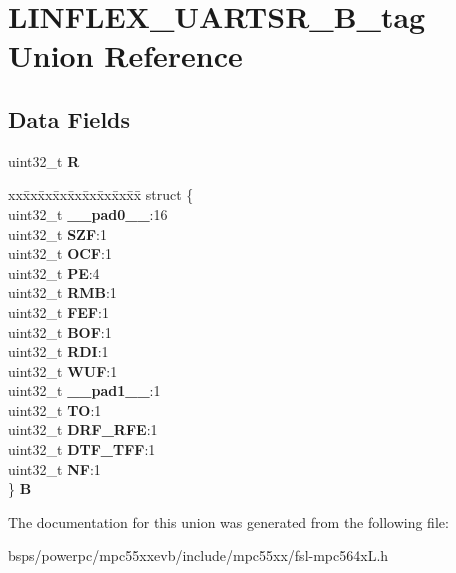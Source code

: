 \hypertarget{unionLINFLEX__UARTSR__32B__tag}{}\section{L\+I\+N\+F\+L\+E\+X\+\_\+\+U\+A\+R\+T\+S\+R\+\_\+B\+\_\+tag Union Reference}
\label{unionLINFLEX__UARTSR__32B__tag}
\subsection*{Data Fields}
\begin{DoxyCompactItemize}
\item 
\mbox{\label{unionLINFLEX__UARTSR__32B__tag_add5396fa221609f1218bc36d07edf76e}} 
uint32\+\_\+t {\bfseries R}
\item 
\mbox{\label{unionLINFLEX__UARTSR__32B__tag_a8f66f92f8185b42ebfa4aa36dd5bd1dd}} 
\begin{tabbing}
xx\=xx\=xx\=xx\=xx\=xx\=xx\=xx\=xx\=\kill
struct \{\\
\>uint32\_t {\bfseries \_\_pad0\_\_}:16\\
\>uint32\_t {\bfseries SZF}:1\\
\>uint32\_t {\bfseries OCF}:1\\
\>uint32\_t {\bfseries PE}:4\\
\>uint32\_t {\bfseries RMB}:1\\
\>uint32\_t {\bfseries FEF}:1\\
\>uint32\_t {\bfseries BOF}:1\\
\>uint32\_t {\bfseries RDI}:1\\
\>uint32\_t {\bfseries WUF}:1\\
\>uint32\_t {\bfseries \_\_pad1\_\_}:1\\
\>uint32\_t {\bfseries TO}:1\\
\>uint32\_t {\bfseries DRF\_RFE}:1\\
\>uint32\_t {\bfseries DTF\_TFF}:1\\
\>uint32\_t {\bfseries NF}:1\\
\} {\bfseries B}\\

\end{tabbing}\end{DoxyCompactItemize}


The documentation for this union was generated from the following file\+:\begin{DoxyCompactItemize}
\item 
bsps/powerpc/mpc55xxevb/include/mpc55xx/fsl-\/mpc564x\+L.\+h\end{DoxyCompactItemize}
